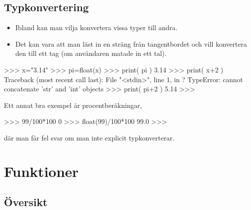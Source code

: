 \documentclass{beamer}
\begin{document}
\subsection{Typkonvertering}

\begin{frame}{\insertsubsectionhead}
  \begin{itemize}
    \item Ibland kan man vilja konvertera vissa typer till andra.
    \item Det kan vara att man läst in en sträng från tangentbordet och vill 
      konvertera den till ett tag (om användaren matade in ett tal).
  \end{itemize}
\end{frame}

\begin{frame}[fragile]{\insertsubsectionhead}
  \begin{terminal}
>>> x="3.14"
>>> pi=float(x)
>>> print( pi )
3.14
>>> print( x+2 )
Traceback (most recent call last):
  File "<stdin>", line 1, in ?
  TypeError: cannot concatenate 'str' and 'int' objects
>>> print( pi+2 )
5.14
>>>
  \end{terminal}
\end{frame}

\begin{frame}[fragile]{\insertsubsectionhead}
  Ett annat bra exempel är procentberäkningar,
  \begin{terminal}
>>> 99/100*100
0
>>> float(99)/100*100
99.0
>>>
  \end{terminal}
  där man får fel svar om man inte explicit typkonverterar.
\end{frame}


\section{Funktioner}

\subsection{Översikt}
\end{document}
